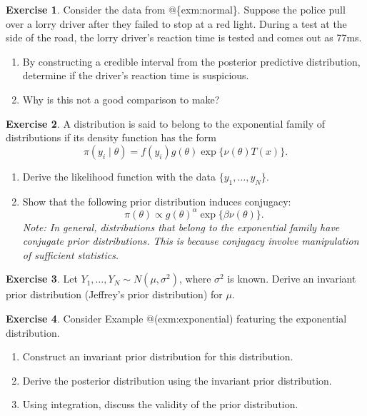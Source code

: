 \documentclass[
]{book}
\providecommand{\tightlist}{%
  \setlength{\itemsep}{0pt}\setlength{\parskip}{0pt}}
\theoremstyle{definition}
\theoremstyle{definition}
\theoremstyle{definition}
\newtheorem{exercise}{Exercise}[chapter]
\theoremstyle{definition}
\theoremstyle{remark}
\begin{document}
\begin{exercise}

Consider the data from @\{exm:normal\}. Suppose the police pull over a lorry driver after they failed to stop at a red light. During a test at the side of the road, the lorry driver's reaction time is tested and comes out as 77ms.

\begin{enumerate}
\def\labelenumi{\arabic{enumi}.}
\tightlist
\item
  By constructing a credible interval from the posterior predictive distribution, determine if the driver's reaction time is suspicious.
\item
  Why is this not a good comparison to make?
\end{enumerate}

\end{exercise}

\begin{exercise}

A distribution is said to belong to the exponential family of distributions if its density function has the form
\[
\pi(y_i \mid \theta) = f(y_i)g(\theta)\exp\{\nu(\theta)T(x)\}. 
\]

\begin{enumerate}
\def\labelenumi{\arabic{enumi}.}
\tightlist
\item
  Derive the likelihood function with the data \(\{y_1, \ldots, y_N\}\).
\item
  Show that the following prior distribution induces conjugacy:
  \[
   \pi(\theta) \propto g(\theta)^\alpha\exp\{\beta\nu(\theta)\}.
   \]
  \emph{Note: In general, distributions that belong to the exponential family have conjugate prior distributions. This is because conjugacy involve manipulation of sufficient statistics.}
\end{enumerate}

\end{exercise}

\begin{exercise}
Let \(Y_1, \ldots, Y_N \sim N(\mu, \sigma^2)\), where \(\sigma^2\) is known. Derive an invariant prior distribution (Jeffrey's prior distribution) for \(\mu\).
\end{exercise}

\begin{exercise}

Consider Example @(exm:exponential) featuring the exponential distribution.

\begin{enumerate}
\def\labelenumi{\arabic{enumi}.}
\tightlist
\item
  Construct an invariant prior distribution for this distribution.
\item
  Derive the posterior distribution using the invariant prior distribution.
\item
  Using integration, discuss the validity of the prior distribution.
\end{enumerate}

\end{exercise}
\end{document}
